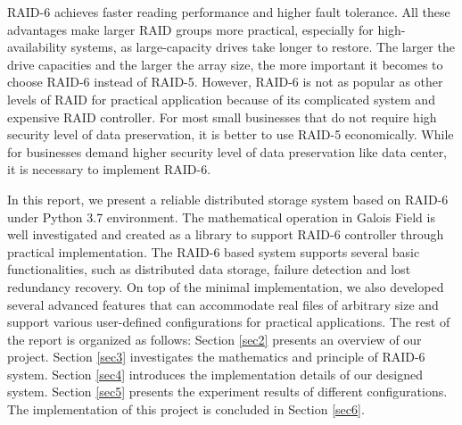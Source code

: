 \documentclass[journal]{IEEEtran}
\begin{document}
RAID-6 achieves faster reading performance and higher fault tolerance. All these advantages make larger RAID groups more practical, especially for high-availability systems, as large-capacity drives take longer to restore. The larger the drive capacities and the larger the array size, the more important it becomes to choose RAID-6 instead of RAID-5. However, RAID-6 is not as popular as other levels of RAID for practical application because of its complicated system and expensive RAID controller. For most small businesses that do not require high security level of data preservation, it is better to use RAID-5 economically. While for businesses demand higher security level of data preservation like data center, it is necessary to implement RAID-6.

In this report, we present a reliable distributed storage system based on RAID-6 under Python 3.7 environment. The mathematical operation in Galois Field is well investigated and created as a library to support RAID-6 controller through practical implementation. The RAID-6 based system supports several basic functionalities, such as distributed data storage, failure detection and lost redundancy recovery. On top of the minimal implementation, we also developed several advanced features that can accommodate real files of arbitrary size and support various user-defined configurations for practical applications. The rest of the report is organized as follows: Section \ref{sec2} presents an overview of our project. Section \ref{sec3} investigates the mathematics and principle of RAID-6 system. Section \ref{sec4} introduces the implementation details of our designed system. Section \ref{sec5} presents the experiment results of different configurations. The implementation of this project is concluded in Section \ref{sec6}.
\end{document}
